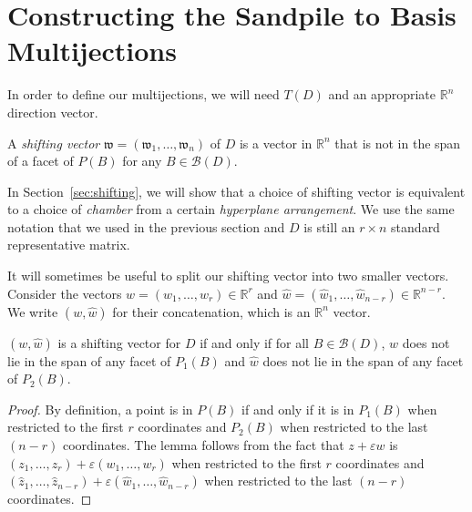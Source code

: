 \documentclass[ALCO,ThmDefs,Unicode,epreuves]{cedram}
\renewcommand{\epsilon}{\varepsilon}
\newcommand{\R}{\mathbb{R}}
\newcommand{\B}{\mathcal{B}}
\newcommand{\w}{\mathfrak w}
\begin{document}
\section{Constructing the Sandpile to Basis Multijections}\label{sec:multi}
In order to define our multijections, we will need $T(D)$ and an appropriate $\R^{n}$ direction vector.

\begin{defi}\label{def:shifting}
A \emph{shifting vector} $\w = (\w_1,\dots,\w_{n})$ of $D$ is a vector in $\R^{n}$ that is not in the span of a facet of $P(B)$ for any $B \in \B(D)$. 
\end{defi}

In Section~\ref{sec:shifting}, we will show that a choice of shifting vector is equivalent to a choice of \emph{chamber} from a certain \emph{hyperplane arrangement}. We use the same notation that we used in the previous section and $D$ is still an $r \times n$ standard representative matrix. 

It will sometimes be useful to split our shifting vector into two smaller vectors. Consider the vectors $w = (w_1,\dots,w_r) \in \R^r$ and $\widehat w = (\widehat w_1,\dots, \widehat w_{n-r})\in \R^{n-r}$. We write $(w,\widehat w)$ for their concatenation, which is an $\R^n$ vector.
\begin{lemma}\label{lem:splitshift}
$(w,\widehat w)$ is a shifting vector for $D$ if and only if for all $B \in \B(D)$, $w$ does not lie in the span of any facet of $P_1(B)$ and $\widehat w$ does not lie in the span of any facet of $P_2(B)$. 
\end{lemma}
\begin{proof}
By definition, a point is in $P(B)$ if and only if it is in $P_1(B)$ when restricted to the first $r$ coordinates and $P_2(B)$ when restricted to the last $(n-r)$ coordinates. The lemma follows from the fact that $z+ \epsilon w$ is $(z_1,\dots, z_r) + \epsilon (w_1,\dots, w_r)$ when restricted to the first $r$ coordinates and $(\widehat z_1,\dots,\widehat z_{n-r}) + \epsilon (\widehat w_1,\dots, \widehat w_{n-r})$ when restricted to the last $(n-r)$ coordinates.
\end{proof}
\end{document}
